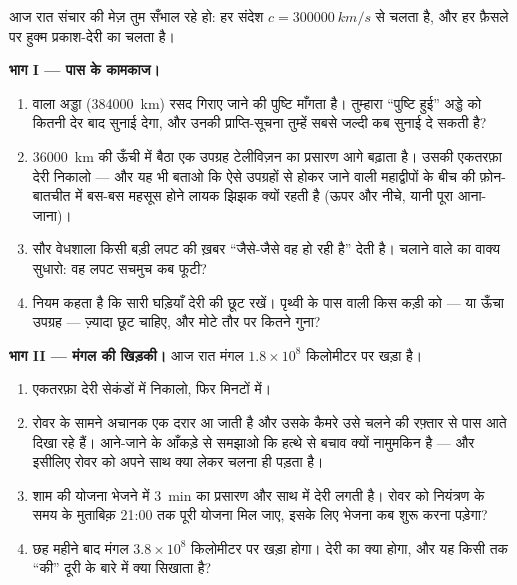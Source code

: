\begin{problem}\label{pb:g8:speed-of-light:1}
आज रात संचार की मेज़ तुम सँभाल रहे हो: हर संदेश $c = \qty{300000}{km/s}$
से चलता है, और हर फ़ैसले पर हुक्म प्रकाश-देरी का चलता है।

\medskip\noindent\textbf{भाग I --- पास के कामकाज।}
\begin{enumerate}
  \item {} वाला अड्डा (\qty{384000}{km}) रसद गिराए जाने की पुष्टि
        माँगता है। तुम्हारा ``पुष्टि हुई'' अड्डे को कितनी देर बाद
        सुनाई देगा, और उनकी प्राप्ति-सूचना तुम्हें सबसे जल्दी कब
        सुनाई दे सकती है?
  \item \qty{36000}{km} की ऊँची  में बैठा एक उपग्रह टेलीविज़न
        का प्रसारण आगे बढ़ाता है। उसकी एकतरफ़ा देरी निकालो --- और यह
        भी बताओ कि ऐसे उपग्रहों से होकर जाने वाली महाद्वीपों के बीच
        की फ़ोन-बातचीत में बस-बस महसूस होने लायक झिझक क्यों रहती है
        (ऊपर और नीचे, यानी पूरा आना-जाना)।
  \item सौर वेधशाला किसी बड़ी लपट की ख़बर ``जैसे-जैसे वह हो रही है''
        देती है। चलाने वाले का वाक्य सुधारो: वह लपट सचमुच कब फूटी?
  \item नियम कहता है कि सारी घड़ियाँ देरी की छूट रखें। पृथ्वी के पास
        वाली किस कड़ी को ---  या ऊँचा उपग्रह --- ज़्यादा छूट
        चाहिए, और मोटे तौर पर कितने गुना?
\end{enumerate}

\medskip\noindent\textbf{भाग II --- मंगल की खिड़की।}
आज रात मंगल $1.8 \times 10^{8}$ किलोमीटर पर खड़ा है।
\begin{enumerate}[resume]
  \item एकतरफ़ा देरी सेकंडों में निकालो, फिर मिनटों में।
  \item रोवर के सामने अचानक एक दरार आ जाती है और उसके कैमरे उसे चलने
        की रफ़्तार से पास आते दिखा रहे हैं। आने-जाने के आँकड़े से
        समझाओ कि हत्थे से बचाव क्यों नामुमकिन है --- और इसीलिए रोवर
        को अपने साथ क्या लेकर चलना ही पड़ता है।
  \item शाम की योजना भेजने में \qty{3}{min} का प्रसारण और साथ में
        देरी लगती है। रोवर को नियंत्रण के समय के मुताबिक़ 21:00 तक
        पूरी योजना मिल जाए, इसके लिए भेजना कब शुरू करना पड़ेगा?
  \item छह महीने बाद मंगल $3.8 \times 10^{8}$ किलोमीटर पर खड़ा होगा।
        देरी का क्या होगा, और यह किसी  तक ``की'' दूरी के बारे में
        क्या सिखाता है?
\end{enumerate}


\end{problem}
